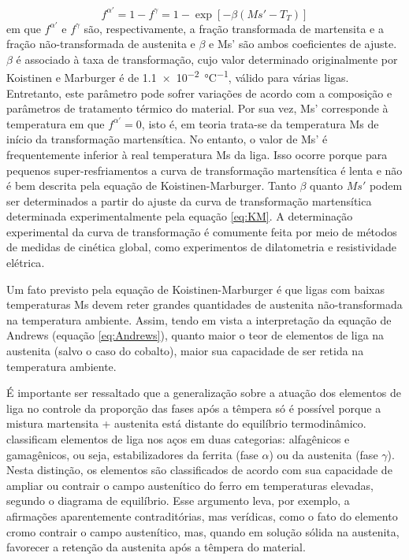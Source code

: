 \begin{equation}
  f^{\alpha'} = 1 - f^\gamma = 1 - \exp \left[ - \beta \left( Ms' - T_T \right)\right]
  \label{eq:KM}
\end{equation}
%
em que $f^{\alpha'}$ e $f^\gamma$ são, respectivamente, a fração transformada de martensita e a fração não-transformada de austenita e $\beta$ e Ms' são ambos coeficientes de ajuste. $\beta$ é associado à taxa de transformação, cujo valor determinado originalmente por Koistinen e Marburger é de \SI{1.1e-2}{\degreeCelsius^{-1}}, válido para várias ligas. Entretanto, este parâmetro pode sofrer variações de acordo com a composição e parâmetros de tratamento térmico do material. Por sua vez, Ms' corresponde à temperatura em que $f^{\alpha'} = 0$, isto é, em teoria trata-se da temperatura Ms de início da transformação martensítica. No entanto, o valor de Ms' é frequentemente inferior à real temperatura Ms da liga. Isso ocorre porque para pequenos super-resfriamentos a curva de transformação martensítica é lenta e não é bem descrita pela equação de Koistinen-Marburger. Tanto $\beta$ quanto $Ms'$ podem ser determinados a partir do ajuste da curva de transformação martensítica determinada experimentalmente pela equação \ref{eq:KM}. A determinação experimental da curva de transformação é comumente feita por meio de métodos de medidas de cinética global, como experimentos de dilatometria e resistividade elétrica\cite{DeMoor2009}.


Um fato previsto pela equação de Koistinen-Marburger é que ligas com baixas temperaturas Ms devem reter grandes quantidades de austenita não-transformada na temperatura ambiente. Assim, tendo em vista a interpretação da equação de Andrews (equação \ref{eq:Andrews}), quanto maior o teor de elementos de liga na austenita (salvo o caso do cobalto), maior sua capacidade de ser retida na temperatura ambiente.

É importante ser ressaltado que a generalização sobre a atuação dos elementos de liga no controle da proporção das fases após a têmpera só é possível porque a mistura martensita + austenita está distante do equilíbrio termodinâmico.  classificam elementos de liga nos aços em duas categorias: alfagênicos e gamagênicos, ou seja, estabilizadores da ferrita (fase $\alpha$) ou da austenita (fase $\gamma$). Nesta distinção, os elementos são classificados de acordo com sua capacidade de ampliar ou contrair o campo austenítico do ferro em temperaturas elevadas, segundo o diagrama de equilíbrio. Esse argumento leva, por exemplo, a afirmações aparentemente contraditórias, mas verídicas, como o fato do elemento cromo contrair o campo austenítico, mas, quando em solução sólida na austenita, favorecer a retenção da austenita após a têmpera do material.

